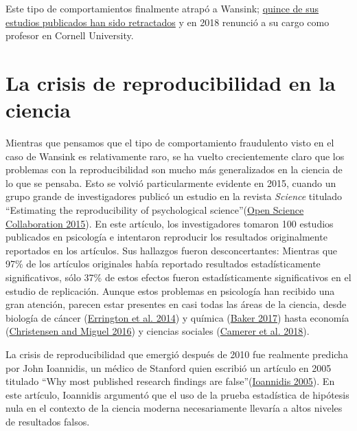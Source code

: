 \documentclass[
  12pt,
]{book}
\begin{document}
Este tipo de comportamientos finalmente atrapó a Wansink; \href{https://www.vox.com/science-and-health/2018/9/19/17879102/brian-wansink-cornell-food-brand-lab-retractions-jama}{quince de sus estudios publicados han sido retractados} y en 2018 renunció a su cargo como profesor en Cornell University.

\hypertarget{la-crisis-de-reproducibilidad-en-la-ciencia}{%
\section{La crisis de reproducibilidad en la ciencia}\label{la-crisis-de-reproducibilidad-en-la-ciencia}}

Mientras que pensamos que el tipo de comportamiento fraudulento visto en el caso de Wansink es relativamente raro, se ha vuelto crecientemente claro que los problemas con la reproducibilidad son mucho más generalizados en la ciencia de lo que se pensaba. Esto se volvió particularmente evidente en 2015, cuando un grupo grande de investigadores publicó un estudio en la revista \emph{Science} titulado ``Estimating the reproducibility of psychological science''(\protect\hyperlink{ref-open:2015}{Open Science Collaboration 2015}). En este artículo, los investigadores tomaron 100 estudios publicados en psicología e intentaron reproducir los resultados originalmente reportados en los artículos. Sus hallazgos fueron desconcertantes: Mientras que 97\% de los artículos originales había reportado resultados estadísticamente significativos, sólo 37\% de estos efectos fueron estadísticamente significativos en el estudio de replicación. Aunque estos problemas en psicología han recibido una gran atención, parecen estar presentes en casi todas las áreas de la ciencia, desde biología de cáncer (\protect\hyperlink{ref-erri:iorn:gunn:2014}{Errington et al. 2014}) y química (\protect\hyperlink{ref-bake:2017}{Baker 2017}) hasta economía (\protect\hyperlink{ref-NBERw22989}{Christensen and Miguel 2016}) y ciencias sociales (\protect\hyperlink{ref-Camerer2018EvaluatingTR}{Camerer et al. 2018}).

La crisis de reproducibilidad que emergió después de 2010 fue realmente predicha por John Ioannidis, un médico de Stanford quien escribió un artículo en 2005 titulado ``Why most published research findings are false''(\protect\hyperlink{ref-ioan:2005}{Ioannidis 2005}). En este artículo, Ioannidis argumentó que el uso de la prueba estadística de hipótesis nula en el contexto de la ciencia moderna necesariamente llevaría a altos niveles de resultados falsos.
\end{document}
